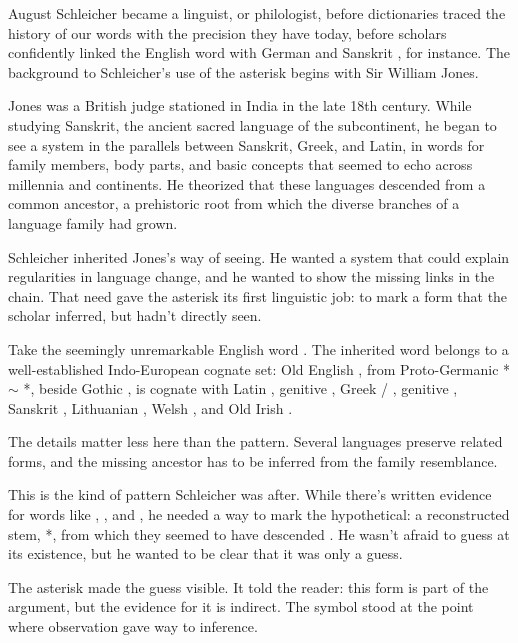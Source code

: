 August Schleicher became a linguist, or philologist, before dictionaries
traced the history of our words with the precision they have today,
before scholars confidently linked the English word 
with German  and Sanskrit , for instance.
The background to Schleicher's use of the asterisk begins with Sir
William Jones.

Jones was a British judge stationed in India in the late 18th century.
While studying Sanskrit, the ancient sacred language of the subcontinent,
he began to see a system in the parallels between Sanskrit, Greek, and
Latin, in words for family
members, body parts, and basic concepts that seemed to echo across
millennia and continents. He theorized that these languages descended
from a common ancestor, a prehistoric root from which the diverse
branches of a language family had grown.

Schleicher inherited Jones's way of seeing. He wanted a system that could
explain regularities in language change, and he wanted to show the
missing links in the chain. That need gave the asterisk its first
linguistic job: to mark a form that the scholar inferred, but hadn't
directly seen.

Take the seemingly unremarkable English word . The
inherited word belongs to a well-established Indo-European cognate set:
Old English , from Proto-Germanic *
\ensuremath{\sim} *, beside Gothic , is
cognate with Latin , genitive , Greek
 / , genitive , Sanskrit
, Lithuanian , Welsh ,
and Old Irish  \citep{OEDtooth2026}.

The details matter less here than the pattern. Several languages
preserve related forms, and the missing ancestor has to be inferred from
the family resemblance.

This is the kind of pattern Schleicher was after. While there's written
evidence for words like , , and
, he needed a way to mark the hypothetical: a
reconstructed stem, *, from which they seemed to have
descended \citep[53]{Schleicher1874Compendium}. He wasn't afraid to
guess at its existence, but he wanted to be clear that it was only a
guess.

The asterisk made the guess visible. It told the reader: this form is
part of the argument, but the evidence for it is indirect. The symbol
stood at the point where observation gave way to inference.

